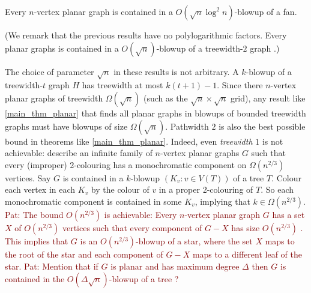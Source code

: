 \documentclass{patmorin}
\newcommand{\pat}[1]{\textcolor{Maroon}{Pat: #1}}
\begin{document}
\begin{thm}\label{main_thm_planar}
  Every $n$-vertex planar graph is contained in a $O(\sqrt{n}\log^2 n)$-blowup of a fan.
\end{thm}

(We remark that the previous results \cite{ISW,distel.dujmovic.ea:product} have no polylogarithmic factors.  Every planar graphs is contained in a $O(\sqrt{n})$-blowup of a treewidth-$2$ graph \cite{distel.dujmovic.ea:product}.)

The choice of parameter $\sqrt{n}$ in these results is not arbitrary. A $k$-blowup of a treewidth-$t$ graph $H$ has treewidth at most $k(t+1)-1$.  Since there $n$-vertex planar graphs of treewidth $\Omega(\sqrt{n})$ (such as the $\sqrt{n}\times\sqrt{n}$ grid), any result like \cref{main_thm_planar} that finds all planar graphs in blowups of bounded treewidth graphs must have blowups of size $\Omega(\sqrt{n})$.  Pathwidth $2$ is also the best possible bound in theorems like  \cref{main_thm_planar}.  Indeed, even \emph{treewidth} $1$ is not achievable:  \citet{LMST08} describe an infinite family of $n$-vertex planar graphs $G$ such that every (improper) 2-colouring has a monochromatic component on $\Omega(n^{2/3})$ vertices. Say $G$ is contained in a $k$-blowup $(K_v:v\in V(T))$ of a tree $T$. Colour each vertex in each $K_v$ by the colour of $v$ in a proper 2-colouring of $T$. So each monochromatic component is contained in some $K_v$, implying that $k\in\Omega(n^{2/3})$.  \pat{The bound $O(n^{2/3})$ is achievable: Every $n$-vertex planar graph $G$ has a set $X$ of $O(n^{2/3})$ vertices such that every component of $G-X$ has size $O(n^{2/3})$ \cite{lipton.tarjan:applications}.  This implies that $G$ is an $O(n^{2/3})$-blowup of a star, where the set $X$ maps to the root of the star and each component of $G-X$ maps to a different leaf of the star.}
\pat{Mention that if $G$ is planar and has maximum degree $\Delta$ then $G$ is contained in the $O(\Delta\sqrt{n})$-blowup of a tree \cite{ding.oporowski:some}?}
\end{document}
